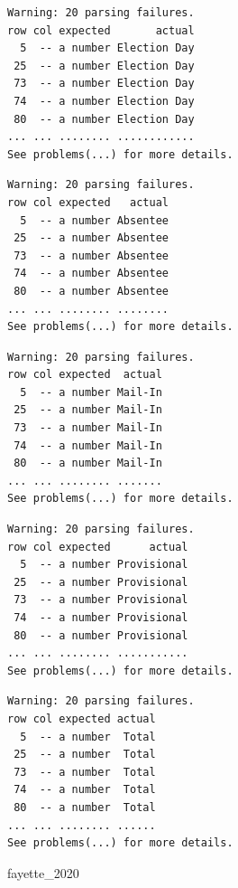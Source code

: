 \documentclass[
  letterpaper,
  DIV=11,
  numbers=noendperiod]{scrreprt}
\newenvironment{Shaded}{\begin{snugshade}}{\end{snugshade}}
\newcommand{\NormalTok}[1]{\textcolor[rgb]{0.00,0.23,0.31}{#1}}
\begin{document}
\begin{verbatim}
Warning: 20 parsing failures.
row col expected       actual
  5  -- a number Election Day
 25  -- a number Election Day
 73  -- a number Election Day
 74  -- a number Election Day
 80  -- a number Election Day
... ... ........ ............
See problems(...) for more details.
\end{verbatim}

\begin{verbatim}
Warning: 20 parsing failures.
row col expected   actual
  5  -- a number Absentee
 25  -- a number Absentee
 73  -- a number Absentee
 74  -- a number Absentee
 80  -- a number Absentee
... ... ........ ........
See problems(...) for more details.
\end{verbatim}

\begin{verbatim}
Warning: 20 parsing failures.
row col expected  actual
  5  -- a number Mail-In
 25  -- a number Mail-In
 73  -- a number Mail-In
 74  -- a number Mail-In
 80  -- a number Mail-In
... ... ........ .......
See problems(...) for more details.
\end{verbatim}

\begin{verbatim}
Warning: 20 parsing failures.
row col expected      actual
  5  -- a number Provisional
 25  -- a number Provisional
 73  -- a number Provisional
 74  -- a number Provisional
 80  -- a number Provisional
... ... ........ ...........
See problems(...) for more details.
\end{verbatim}

\begin{verbatim}
Warning: 20 parsing failures.
row col expected actual
  5  -- a number  Total
 25  -- a number  Total
 73  -- a number  Total
 74  -- a number  Total
 80  -- a number  Total
... ... ........ ......
See problems(...) for more details.
\end{verbatim}

\begin{Shaded}
\begin{Highlighting}[]
\NormalTok{fayette\_2020}
\end{Highlighting}
\end{Shaded}
\end{document}
